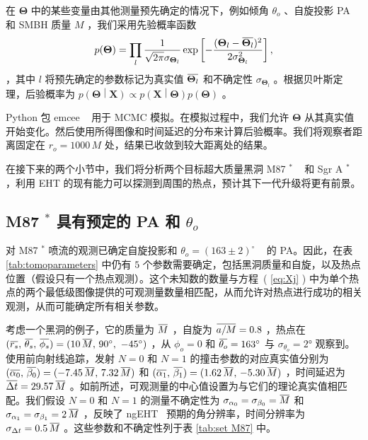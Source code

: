 \documentclass[aps,reprint,superscriptaddress,nofootinbib,floatfix,longbibliography,preprintnumbers]{revtex4-1}
\newcommand{\overbar}[1]{\mkern 1mu\overline{\mkern-1mu#1\mkern-1mu}\mkern 1mu}
\begin{document}
在    $\bm{\Theta}$    中的某些变量由其他测量预先确定的情况下，例如倾角    $\theta_o$    、自旋投影 PA 和 SMBH 质量    $M$    ，我们采用先验概率函数
   \begin{equation}
    p(\bm{\Theta}) = \prod_{l} \frac{1}{\sqrt{2\pi}\sigma_{\bm{\Theta}_l}}\exp\left[-\frac{(\bm{\Theta}_l-\overbar{\bm{\Theta}_l})^2}{2\sigma_{\bm{\Theta}_l}^2}\right],
\end{equation}    ，其中    $l$    将预先确定的参数标记为真实值    $\overbar{\bm{\Theta}_l}$    和不确定性    $\sigma_{\bm{\Theta}_l}$    。根据贝叶斯定理，后验概率为
   $p\left(\bm{\Theta}\middle|\bm{X}\right)\propto p\left(\bm{X}\middle|\bm{\Theta}\right) p(\bm{\Theta})$    。  

Python 包 emcee ~    \cite{Foreman_Mackey_2013}    用于 MCMC 模拟。在模拟过程中，我们允许    $\bm{\Theta}$    从其真实值开始变化。然后使用所得图像和时间延迟的分布来计算后验概率。我们将观察者距离固定在    $r_o=1000\,M$    处，结果已收敛到较大距离处的结果。  

在接下来的两个小节中，我们将分析两个目标超大质量黑洞 M87    $^*$    ~    \cite{EventHorizonTelescope:2019ggy}    和 Sgr A    $^*$    ~    \cite{EventHorizonTelescope:2022exc}   ，利用 EHT 的现有能力可以探测到周围的热点，预计其下一代升级将更有前景。  

   \subsection{M87    $^*$    具有预定的 PA 和    $\theta_o$     }    
   \label{subsec:M87}     

对 M87    $^*$    喷流的观测已确定自旋投影和    $\theta_o = {(163\pm 2)}^\circ$    ~    \cite{EventHorizonTelescope:2019pgp}    的 PA。因此，在表~    \ref{tab:tomoparameters}    中仍有    $5$    个参数需要确定，包括黑洞质量和自旋，以及热点位置（假设只有一个热点观测）。这个未知数的数量与方程~(    \ref{eq:Xj}    ) 中为单个热点的两个最低级图像提供的可观测量数量相匹配，从而允许对热点进行成功的相关观测，从而可能确定所有相关参数。  

考虑一个黑洞的例子，它的质量为    $\overbar{M}$    ，自旋为    $\overbar{a/M} = 0.8$    ，热点在    $(\overbar{r_s},\,\overbar{\theta_s},\,\overbar{\phi_s}) = (10\,\overbar{M},\,\ang{90}, \  \ang{-45})$    ，从    $\phi_o = 0$    和    $\overbar{\theta_o} = \ang{163}$    与    $\sigma_{\theta_o} = \ang{2}$    观察到。使用前向射线追踪，发射    $N=0$    和    $N=1$    的撞击参数的对应真实值分别为    $(\overbar{\alpha_0},\,\overbar{\beta_0}) = (-7.45\,\overbar{M},\, 7.32\,\overbar{M})$    和    $(\overbar{\alpha_1},\,\overbar{\beta_1}) = (1.62\,\overbar{M},\, -5.30\,\overbar{M})$    ，时间延迟为    $\overbar{\Delta t} = 29.57\,\overbar{M}$    。如前所述，可观测量的中心值设置为与它们的理论真实值相匹配。我们假设    $N=0$    和    $N=1$    的测量不确定性为    $\sigma_{\alpha_0} = \sigma_{\beta_0} = \overbar{M}$    和    $\sigma_{\alpha_1} = \sigma_{\beta_1} = 2\,\overbar{M}$    ，反映了 ngEHT~    \cite{Chael:2021rjo,Lico:2023mus}    预期的角分辨率，时间分辨率为    $\sigma_{\Delta t} = 0.5\,\overbar{M}$    。这些参数和不确定性列于表    \ref{tab:set M87}    中。  
\end{document}
